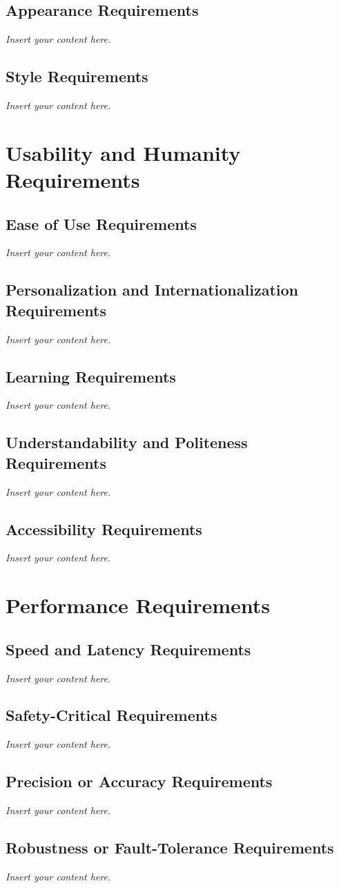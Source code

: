 \documentclass[12pt]{article}
\newcommand{\lips}{\textit{Insert your content here.}}
\begin{document}
\subsection{Appearance Requirements}
\lips
\subsection{Style Requirements}
\lips

\section{Usability and Humanity Requirements}
\subsection{Ease of Use Requirements}
\lips
\subsection{Personalization and Internationalization Requirements}
\lips
\subsection{Learning Requirements}
\lips
\subsection{Understandability and Politeness Requirements}
\lips
\subsection{Accessibility Requirements}
\lips

\section{Performance Requirements}
\subsection{Speed and Latency Requirements}
\lips
\subsection{Safety-Critical Requirements}
\lips
\subsection{Precision or Accuracy Requirements}
\lips
\subsection{Robustness or Fault-Tolerance Requirements}
\lips
\end{document}
